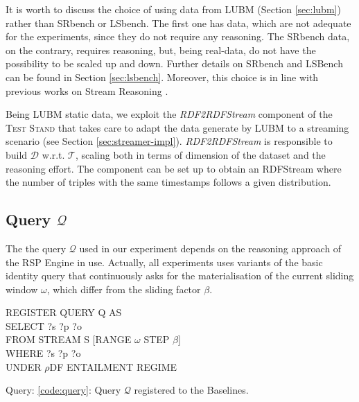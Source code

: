 It is worth to discuss the choice of using data from LUBM (Section \ref{sec:lubm}) rather than SRbench or LSbench. The first one has data, which are not adequate for the experiments, since they do not require any reasoning. The SRbench data, on the contrary, requires reasoning, but, being real-data, do not have the possibility to be scaled up and down. Further details on SRbench and LSBench can be found in Section \ref{sec:lsbench}. Moreover, this choice is in line with previous works on Stream Reasoning \cite{DBLP:conf/semweb/UrbaniMJHB13}. 

Being LUBM static data, we exploit the \textit{RDF2RDFStream} component of the \textsc{Test Stand} that takes care to adapt the data generate by LUBM to a streaming scenario (see Section \ref{sec:streamer-impl}). \textit{RDF2RDFStream} is responsible to build $\mathcal{D}$ w.r.t. $\mathcal{T}$, scaling both in terms of dimension of the dataset and the reasoning effort. The component can be set up to obtain an RDFStream where the number of triples with the same timestamps follows a given distribution. %

\subsection{Query $\mathcal{Q}$}\label{sec:query}
 
The the query $\mathcal{Q}$ used in our experiment depends on the reasoning approach of the RSP Engine in use. Actually, all  experiments uses variants of the basic identity query that continuously asks for the materialisation of the current sliding window $\omega$, which differ from the sliding factor $\beta$.\\

\begin{center}
\raggedright
REGISTER QUERY Q AS \\
SELECT ?s ?p ?o \\
FROM STREAM S [RANGE $\omega$ STEP $\beta$]\\
WHERE {?s ?p ?o}\\
UNDER $\rho$DF ENTAILMENT REGIME
\label{code:query}

\end{center}
Query: \ref{code:query}: Query $\mathcal{Q}$ registered to the \name Baselines.\\


